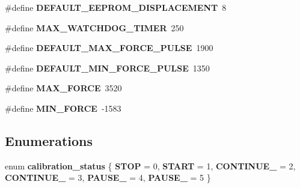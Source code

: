 \begin{DoxyCompactItemize}
\#define {\bfseries D\+E\+F\+A\+U\+L\+T\+\_\+\+E\+E\+P\+R\+O\+M\+\_\+\+D\+I\+S\+P\+L\+A\+C\+E\+M\+E\+NT}~8
\item 
\mbox{\label{globals_8h_a887dbd571d7f138cbe0e994e3fcc661b}} 
\#define {\bfseries M\+A\+X\+\_\+\+W\+A\+T\+C\+H\+D\+O\+G\+\_\+\+T\+I\+M\+ER}~250
\item 
\mbox{\label{globals_8h_a7e2e5b1bc045884a431b736d1013f596}} 
\#define {\bfseries D\+E\+F\+A\+U\+L\+T\+\_\+\+M\+A\+X\+\_\+\+F\+O\+R\+C\+E\+\_\+\+P\+U\+L\+SE}~1900
\item 
\mbox{\label{globals_8h_a1ca2fe6e680bc3f719ae07077b880784}} 
\#define {\bfseries D\+E\+F\+A\+U\+L\+T\+\_\+\+M\+I\+N\+\_\+\+F\+O\+R\+C\+E\+\_\+\+P\+U\+L\+SE}~1350
\item 
\mbox{\label{globals_8h_a88e979262de6afe15c6a99b6c9eee91a}} 
\#define {\bfseries M\+A\+X\+\_\+\+F\+O\+R\+CE}~3520
\item 
\mbox{\label{globals_8h_a786cfa1cc7ee1aa11cceecde022e4db2}} 
\#define {\bfseries M\+I\+N\+\_\+\+F\+O\+R\+CE}~-\/1583
\end{DoxyCompactItemize}
\subsection*{Enumerations}
\begin{DoxyCompactItemize}
\item 
\mbox{\label{globals_8h_a97a989322df9dca90b38ef77610b8301}} 
enum {\bfseries calibration\+\_\+status} \{ \newline
{\bfseries S\+T\+OP} = 0, 
{\bfseries S\+T\+A\+RT} = 1, 
{\bfseries C\+O\+N\+T\+I\+N\+U\+E\+\_} = 2, 
{\bfseries C\+O\+N\+T\+I\+N\+U\+E\+\_} = 3, 
\newline
{\bfseries P\+A\+U\+S\+E\+\_} = 4, 
{\bfseries P\+A\+U\+S\+E\+\_} = 5
 \}
\end{DoxyCompactItemize}
